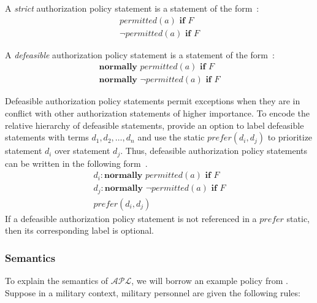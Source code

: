 \begin{definition}
    \label{def:strict_authorization_statements}
    A \textit{strict} authorization policy statement is a statement of the form~\citep{gelfond_authorization_2008}:
    \begin{gather*}
        permitted\left(a\right) \textbf{ if } F \\
        \neg permitted\left(a\right) \textbf{ if } F
    \end{gather*}
\end{definition}

\begin{definition}
    \label{def:defeasible_authorization_statements}
    A \textit{defeasible} authorization policy statement is a statement of the form~\citep{gelfond_authorization_2008}:
    \begin{gather*}
        \textbf{normally } permitted(a) \textbf{ if } F \\
        \textbf{normally } \neg permitted(a) \textbf{ if } F
    \end{gather*}
\end{definition}

Defeasible authorization policy statements permit exceptions when they are in conflict with other authorization statements of higher importance.
To encode the relative hierarchy of defeasible statements, \citet{gelfond_authorization_2008} provide an option to label defeasible statements with terms $d_1,d_2,\ldots,d_n$ and use the static $prefer\left(d_i,d_j\right)$ to prioritize statement $d_i$ over statement $d_j$.
Thus, defeasible authorization policy statements can be written in the following form~\citep{gelfond_authorization_2008}.
\begin{gather*}
    d_i: \textbf{normally } permitted(a) \textbf{ if } F \\
    d_j: \textbf{normally } \neg permitted(a) \textbf{ if } F \\
    prefer(d_i, d_j)
\end{gather*}
If a defeasible authorization policy statement is not referenced in a $prefer$ static, then its corresponding label is optional.

\subsubsection{Semantics}

To explain the semantics of $\mathcal{APL}$, we will borrow an example policy from \citet{gelfond_authorization_2008}.
Suppose in a military context, military personnel are given the following rules:

